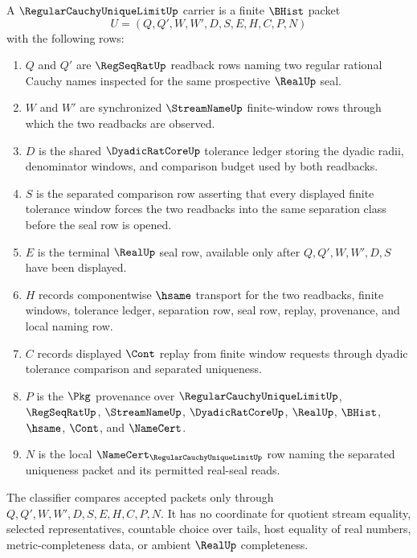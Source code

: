 \begin{definition}
\label{def:regular-cauchy-unique-limit-carrier}
A $\RegularCauchyUniqueLimitUp$ carrier is a finite $\BHist$ packet
$$
U=(Q,Q',W,W',D,S,E,H,C,P,N)
$$
with the following rows:
\begin{enumerate}
\item $Q$ and $Q'$ are $\RegSeqRatUp$ readback rows naming two regular rational Cauchy names inspected for the same prospective $\RealUp$ seal.
\item $W$ and $W'$ are synchronized $\StreamNameUp$ finite-window rows through which the two readbacks are observed.
\item $D$ is the shared $\DyadicRatCoreUp$ tolerance ledger storing the dyadic radii, denominator windows, and comparison budget used by both readbacks.
\item $S$ is the separated comparison row asserting that every displayed finite tolerance window forces the two readbacks into the same separation class before the seal row is opened.
\item $E$ is the terminal $\RealUp$ seal row, available only after $Q,Q',W,W',D,S$ have been displayed.
\item $H$ records componentwise $\hsame$ transport for the two readbacks, finite windows, tolerance ledger, separation row, seal row, replay, provenance, and local naming row.
\item $C$ records displayed $\Cont$ replay from finite window requests through dyadic tolerance comparison and separated uniqueness.
\item $P$ is the $\Pkg$ provenance over $\RegularCauchyUniqueLimitUp$, $\RegSeqRatUp$, $\StreamNameUp$, $\DyadicRatCoreUp$, $\RealUp$, $\BHist$, $\hsame$, $\Cont$, and $\NameCert$.
\item $N$ is the local $\NameCert_{\RegularCauchyUniqueLimitUp}$ row naming the separated uniqueness packet and its permitted real-seal reads.
\end{enumerate}
The classifier compares accepted packets only through $Q,Q',W,W',D,S,E,H,C,P,N$. It has no coordinate for quotient stream equality, selected representatives, countable choice over tails, host equality of real numbers, metric-completeness data, or ambient $\RealUp$ completeness.
\end{definition}

